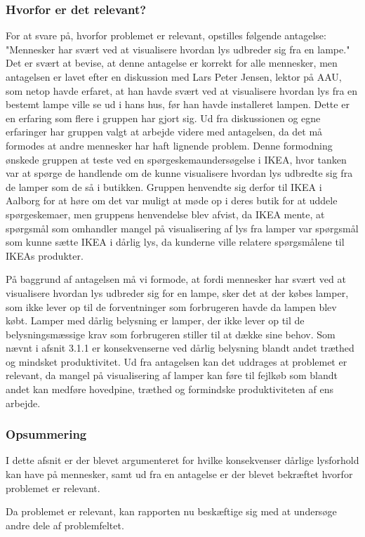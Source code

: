 \subsubsection{Hvorfor er det relevant?}
\label{sec:hvorfor_relavant}
For at svare på, hvorfor problemet er relevant, opstilles følgende antagelse: "Mennesker har svært ved at visualisere hvordan lys udbreder sig fra en lampe." Det er svært at bevise, at denne antagelse er korrekt for alle mennesker, men antagelsen er lavet efter en diskussion med Lars Peter Jensen, lektor på AAU, som netop havde erfaret, at han havde svært ved at visualisere hvordan lys fra en bestemt lampe ville se ud i hans hus, før han havde installeret lampen. Dette er en erfaring som flere i gruppen har gjort sig. Ud fra diskussionen og egne erfaringer har gruppen valgt at arbejde videre med antagelsen, da det må formodes at andre mennesker har haft lignende problem. Denne formodning ønskede gruppen at teste ved en spørgeskemaundersøgelse i IKEA, hvor tanken var at spørge de handlende om de kunne visualisere hvordan lys udbredte sig fra de lamper som de så i butikken. Gruppen henvendte sig derfor til IKEA i Aalborg for at høre om det var muligt at møde op i deres butik for at uddele spørgeskemaer, men gruppens henvendelse blev afvist, da IKEA mente, at spørgsmål som omhandler mangel på visualisering af lys fra lamper var spørgsmål som kunne sætte IKEA i dårlig lys, da kunderne ville relatere spørgsmålene til IKEAs produkter. 

På baggrund af antagelsen må vi formode, at fordi mennesker har svært ved at visualisere hvordan lys udbreder sig for en lampe, sker det at der købes lamper, som ikke lever op til de forventninger som forbrugeren havde da lampen blev købt. Lamper med dårlig belysning er lamper, der ikke lever op til de belysningsmæssige krav som forbrugeren stiller til at dække sine behov. Som nævnt i afsnit 3.1.1 er konsekvenserne ved dårlig belysning blandt andet træthed og mindsket produktivitet.
Ud fra antagelsen kan det uddrages at problemet er relevant, da mangel på visualisering af lamper kan føre til fejlkøb som blandt andet kan medføre hovedpine, træthed og formindske produktiviteten af ens arbejde.

\subsubsection*{Opsummering}
I dette afsnit er der blevet argumenteret for hvilke konsekvenser dårlige lysforhold kan have på mennesker, samt ud fra en antagelse er der blevet bekræftet hvorfor problemet er relevant. 

Da problemet er relevant, kan rapporten nu beskæftige sig med at undersøge andre dele af problemfeltet. 
